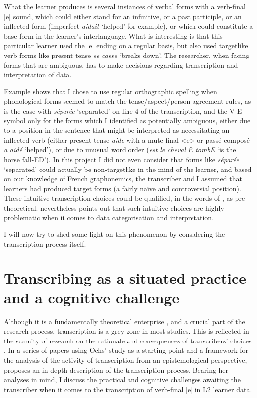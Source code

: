 \documentclass[output=paper,colorlinks,citecolor=brown,modfonts,nonflat]{../langscibook}
\begin{document}
What the learner produces is several instances of verbal forms with a verb-final [e] sound, which could either stand for an infinitive, or a past participle, or an inflected form (imperfect \textit{aidait} ‘helped’ for example), or which could constitute a base form in the learner’s interlanguage. What is interesting is that this particular learner used the [e] ending on a regular basis, but also used targetlike verb forms like present tense \textit{se} \textit{casse} ‘breaks down’. The researcher, when facing forms that are ambiguous, has to make decisions regarding transcription and interpretation of data. 

Example  shows that I chose to use regular orthographic spelling when phonological forms seemed to match the tense/aspect/person agreement rules, as is the case with \textit{séparée} ‘separated’ on line 4 of the transcription, and the V-E symbol only for the forms which I identified as potentially ambiguous, either due to a position in the sentence that might be interpreted as necessitating an inflected verb (either present tense \textit{aide} with a mute final <e> or passé composé \textit{a} \textit{aidé} ‘helped’), or due to unusual word order (\textit{est} \textit{le} \textit{cheval} \textit{\&} \textit{tombE} ‘is the horse fall-ED’). In this project I did not even consider that forms like \textit{séparée} ‘separated’ could actually be non-targetlike in the mind of the learner, and based on our knowledge of French graphonemics, the transcriber and I assumed that learners had produced target forms (a fairly naïve and controversial position). These intuitive transcription choices could be qualified, in the words of \citet{Ortega2014trying}, as pre-theoretical. \citet[3]{Mondada2000} nevertheless points out that such intuitive choices are highly problematic when it comes to data categorisation and interpretation.

I will now try to shed some light on this phenomenon by considering the transcription process itself.

\section{\textbf{Transcribing as a situated practice and a cognitive challenge}}%

Although it is a fundamentally theoretical enterprise \citep{Ochs1979}, and a crucial part of the research process, transcription is a grey zone in most studies. This is reflected in the scarcity of research on the rationale and consequences of transcribers’ choices \citep[46]{Mondada2002}. In a series of papers using Ochs’ study as a starting point and a framework for the analysis of the activity of transcription from an epistemological perspective, \citet{Mondada2000,Mondada2002,Mondada2007} proposes an in-depth description of the transcription process. Bearing her analyses in mind, I discuss the practical and cognitive challenges awaiting the transcriber when it comes to the transcription of verb-final [e] in L2 learner data.
\end{document}
